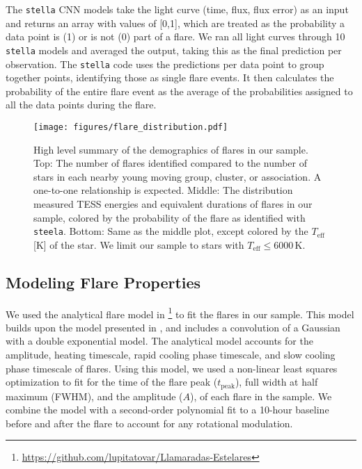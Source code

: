 \documentclass[twocolumn]{aastex631}
\begin{document}
The \texttt{stella} CNN models take the light curve (time, flux, flux error)
as an input and returns an array with values of [0,1], which are treated as
the probability a data point is (1) or is not (0) part of a flare. We ran all
light curves through 10 \texttt{stella} models and averaged the output, taking
this as the final prediction per observation. The \texttt{stella} code uses the
predictions per data point to group together points, identifying those as single
flare events. It then calculates the probability of the entire flare event as
the average of the probabilities assigned to all the data points during the flare.


\begin{figure}[ht!]
    \begin{centering}
        \texttt{[image: figures/flare\_distribution.pdf]}
        \caption{
            High level summary of the demographics of flares in our sample. Top:
            The number of flares identified compared to the number of stars in
            each nearby young moving group, cluster, or association. A one-to-one
            relationship is expected. Middle: The distribution measured TESS energies
            and equivalent durations of flares in our sample, colored by the probability
            of the flare as identified with \texttt{steela}. Bottom: Same as the
            middle plot, except colored by the $T_\textrm{eff}$ [K] of the star.
            We limit our sample to stars with $T_\textrm{eff} \leq 6000$\,K.
        }
        \label{fig:flare_distribution}
    \end{centering}
\end{figure}

\subsection{Modeling Flare Properties}

We used the analytical flare model in
\cite{tovar22}\footnote{\url{https://github.com/lupitatovar/Llamaradas-Estelares}}
to fit the flares in our sample. This model builds upon the model presented
in \cite{davenport14}, and includes a convolution of a Gaussian with a
double exponential model. The analytical model accounts for the amplitude,
heating timescale, rapid cooling phase timescale, and slow cooling phase
timescale of flares. Using this model, we used a non-linear least squares
optimization to fit for the time of the flare peak ($t_\textrm{peak}$),
full width at half maximum (FWHM), and the amplitude ($A$), of each flare
in the sample. We combine the model with a second-order polynomial fit to
a 10-hour baseline before and after the flare to account for any rotational
modulation.
\end{document}
